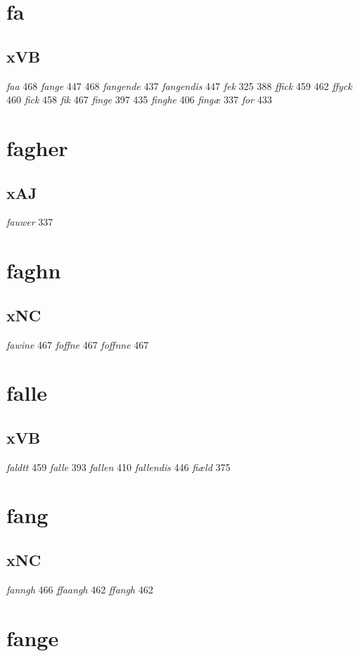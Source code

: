 \documentclass[a4paper,twocolumn]{article}
\begin{document}
\section{fa}
\label{sec:org16ed370}
\subsection{xVB}
\label{sec:orgc94b28c}
\emph{faa} 468 \emph{fange} 447 468 \emph{fangende} 437 \emph{fangendis} 447 \emph{fek} 325 388 \emph{ffick} 459 462 \emph{ffyck} 460 \emph{fick} 458 \emph{fik} 467 \emph{finge} 397 435 \emph{finghe} 406 \emph{fingæ} 337 \emph{for} 433 
\section{fagher}
\label{sec:org539f4c8}
\subsection{xAJ}
\label{sec:org8549059}
\emph{fauwer} 337 
\section{faghn}
\label{sec:orgb2a8803}
\subsection{xNC}
\label{sec:org4ee0d5e}
\emph{fawine} 467 \emph{foffne} 467 \emph{foffnne} 467 
\section{falle}
\label{sec:org9b9f695}
\subsection{xVB}
\label{sec:org983c2c7}
\emph{faldtt} 459 \emph{falle} 393 \emph{fallen} 410 \emph{fallendis} 446 \emph{fiæld} 375 
\section{fang}
\label{sec:orgc6a8a78}
\subsection{xNC}
\label{sec:org21b806f}
\emph{fanngh} 466 \emph{ffaangh} 462 \emph{ffangh} 462 
\section{fange}
\label{sec:org172e628}
\end{document}
